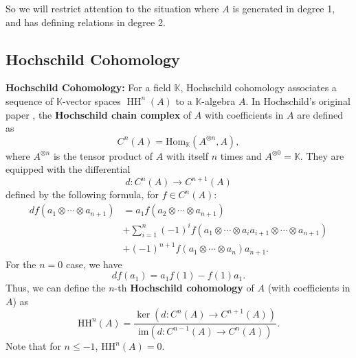 \documentclass{amsart}
\def\HH{\operatorname{HH}}
\begin{document}
So we will restrict attention to the situation where $A$ is generated in degree 1, and has defining relations in degree 2. 

\subsection{Hochschild Cohomology}

\begin{definition}
\textnormal{\textbf{Hochschild Cohomology:}
For a field  $\mathbb{K}$, Hochschild cohomology associates a sequence of $\mathbb{K}$-vector spaces \( \HH^n(A) \) to a $\mathbb{K}$-algebra \( A \). In Hochschild’s original paper \cite[Section 2]{Hochschild1945OnTC}, the \textbf{Hochschild chain complex} of \( A \) with coefficients in \( A \) are defined as
\[
C^n(A) = \text{Hom}_\mathbb{K}(A^{\otimes n}, A),
\]
where \( A^{\otimes n} \) is the tensor product of \( A \) with itself \( n \) times and \( A^{\otimes 0} = \mathbb{K} \). They are equipped with the differential
\[
d : C^n(A) \to C^{n+1}(A)
\]
defined by the following formula, for \( f \in C^n(A) \):
\begin{align*}
d f(a_1 \otimes \cdots \otimes a_{n+1}) &= a_1 f(a_2 \otimes \cdots \otimes a_{n+1}) \\
&+ \sum_{i=1}^n (-1)^i f(a_1 \otimes \cdots \otimes a_i a_{i+1} \otimes \cdots \otimes a_{n+1}) \\
&+ (-1)^{n+1} f(a_1 \otimes \cdots \otimes a_n) a_{n+1}.
\end{align*}
For the \( n = 0 \) case, we have
\[
d f(a_1) = a_1 f(1) - f(1) a_1.
\]
Thus, we can define the \( n \)-th \textbf{Hochschild cohomology} of \( A \) (with coefficients in \( A \)) as
\[
\mathrm{HH}^n(A) = \frac{\ker(d : C^n(A) \to C^{n+1}(A))}{\text{im}(d : C^{n-1}(A) \to C^n(A))}.
\]
Note that for \( n \leq -1 \), \( \mathrm{HH}^n(A) = 0 \).
}
\end{definition}
\end{document}
